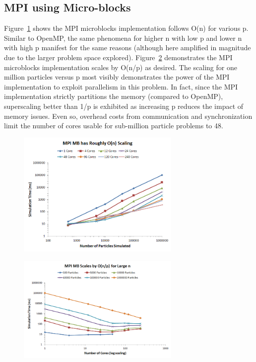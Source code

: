 \documentclass[11pt]{article} %
\begin{document}
\subsection{MPI using Micro-blocks}

Figure~\ref{mpi_mb_n} shows the MPI microblocks implementation follows O(n) for various p. Similar to OpenMP, the same phenomena for higher n with low p and lower n with high p manifest for the same reasons (although here amplified in magnitude due to the larger problem space explored). Figure~\ref{mpi_mb_p} demonstrates the MPI microblocks implementation scales by O(n/p) as desired. The scaling for one million particles versus p most visibly demonstrates the power of the MPI implementation to exploit parallelism in this problem. In fact, since the MPI implementation strictly partitions the memory (compared to OpenMP), superscaling better than 1/p is exhibited as increasing p reduces the impact of memory issues. Even so, overhead costs from communication and synchronization limit the number of cores usable for sub-million particle problems to 48.

\begin{figure}[!h]
\centering
\includegraphics[width=0.7\textwidth]{figures/mpi_mb_n.png}
\caption{}
\label{mpi_mb_n}
\end{figure}

\begin{figure}[!h]
\centering
\includegraphics[width=0.7\textwidth]{figures/mpi_mb_p.png}
\caption{}
\label{mpi_mb_p}
\end{figure}
\end{document}

